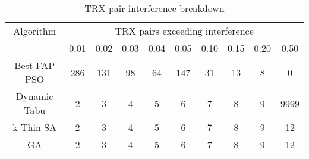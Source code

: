 \begin{table}[H]
\centering
	\begin{tabular}{cccccccccc}
	\toprule
    Algorithm & \multicolumn{9}{c}{TRX pairs exceeding interference}\\
    & 0.01 & 0.02 & 0.03 & 0.04 & 0.05 & 0.10 & 0.15 & 0.20 & 0.50 \\
    \midrule
    Best FAP PSO & 286 & 131 & 98 & 64 & 147 & 31 & 13 & 8 & 0\\
    Dynamic Tabu & 2 & 3 & 4 & 5 & 6 & 7 & 8 & 9 & 9999\\
    k-Thin SA & 2 & 3 & 4 & 5 & 6 & 7 & 8 & 9 & 12\\
    GA & 2 & 3 & 4 & 5 & 6 & 7 & 8 & 9 & 12\\
    \bottomrule
	\end{tabular}
\caption{TRX pair interference breakdown}
\label{tab:breakdown-siem2m1}
\end{table}


